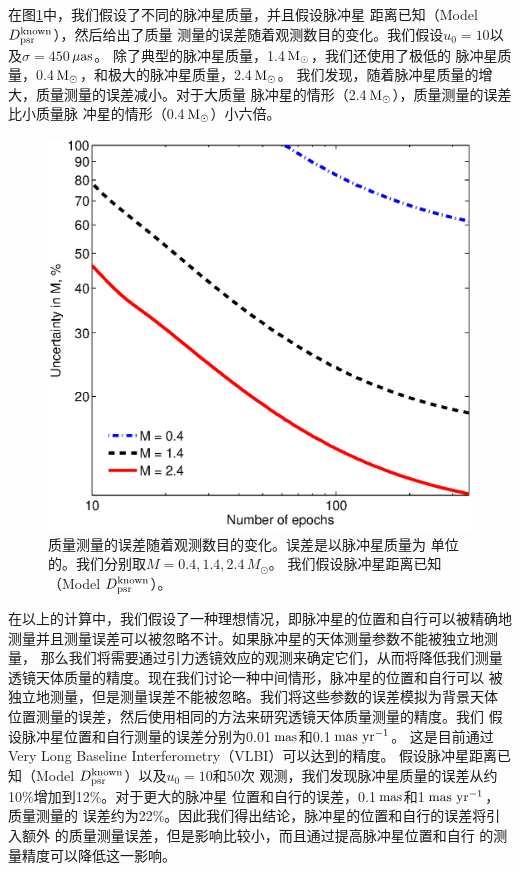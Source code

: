 在图\ref{masses}中，我们假设了不同的脉冲星质量，并且假设脉冲星
距离已知（Model $D_{\rm{psr}}^{\rm{known}}$），然后给出了质量
测量的误差随着观测数目的变化。我们假设$u_0=10$以及$\sigma=450$\,$\rm{\mu as}$。
除了典型的脉冲星质量，1.4\,$\rm{M_{\odot}}$，我们还使用了极低的
脉冲星质量，0.4\,$\rm{M_{\odot}}$，和极大的脉冲星质量，2.4\,$\rm{M_{\odot}}$。
我们发现，随着脉冲星质量的增大，质量测量的误差减小。对于大质量
脉冲星的情形（2.4\,$\rm{M_{\odot}}$），质量测量的误差比小质量脉
冲星的情形（0.4\,$\rm{M_{\odot}}$）小六倍。
%
\begin{figure}
\begin{center}
  \includegraphics[width=3.5 in,trim=0 0 0 3.2cm]{masses.eps}
%
\caption{质量测量的误差随着观测数目的变化。误差是以脉冲星质量为
单位的。我们分别取$M=0.4,1.4,2.4$\,$M_{\odot}$。
我们假设脉冲星距离已知（Model $D_{\rm{psr}}^{\rm{known}}$）。
}
\label{masses}
\end{center}
\end{figure}
%

在以上的计算中，我们假设了一种理想情况，即脉冲星的位置和自行可以被精确地
测量并且测量误差可以被忽略不计。如果脉冲星的天体测量参数不能被独立地测量，
那么我们将需要通过引力透镜效应的观测来确定它们，从而将降低我们测量
透镜天体质量的精度。现在我们讨论一种中间情形，脉冲星的位置和自行可以
被独立地测量，但是测量误差不能被忽略。我们将这些参数的误差模拟为背景天体
位置测量的误差，然后使用相同的方法来研究透镜天体质量测量的精度。我们
假设脉冲星位置和自行测量的误差分别为0.01\,$\rm{mas}$和0.1\,$\rm{mas\ yr^{-1}}$。
这是目前通过Very Long Baseline Interferometry（VLBI）可以达到的精度\supercite{deller}。
假设脉冲星距离已知（Model $D_{\rm{psr}}^{\rm{known}}$）以及$u_0=10$和50次
观测，我们发现脉冲星质量的误差从约10\%增加到12\%。对于更大的脉冲星
位置和自行的误差，0.1\,$\rm{mas}$和1\,$\rm{mas\ yr^{-1}}$，质量测量的
误差约为22\%。因此我们得出结论，脉冲星的位置和自行的误差将引入额外
的质量测量误差，但是影响比较小，而且通过提高脉冲星位置和自行
的测量精度可以降低这一影响。

